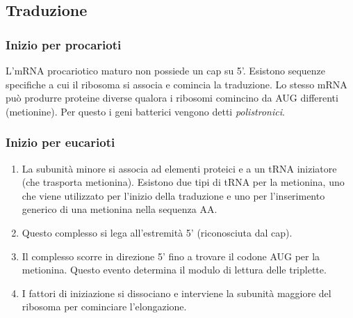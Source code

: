     \subsection{Traduzione}
        \subsubsection{Inizio per procarioti}
            L'mRNA procariotico maturo non possiede un cap su 5'.
            Esistono sequenze specifiche a cui il ribosoma si associa e comincia la traduzione. Lo stesso mRNA può produrre proteine diverse qualora i ribosomi comincino da AUG differenti (metionine). Per questo i geni batterici vengono detti \textit{polistronici}.
        
        \subsubsection{Inizio per eucarioti}
            \begin{enumerate}
                \item La subunità minore si associa ad elementi proteici e a un tRNA iniziatore (che trasporta metionina). Esistono due tipi di tRNA per la metionina, uno che viene utilizzato per l'inizio della traduzione e uno per l'inserimento generico di una metionina nella sequenza AA.
                \item Questo complesso si lega all'estremità 5' (riconosciuta dal cap).
                \item Il complesso scorre in direzione 5' fino a trovare il codone AUG per la metionina. Questo evento determina il modulo di lettura delle triplette.
                \item I fattori di iniziazione si dissociano e interviene la subunità maggiore del ribosoma per cominciare l'elongazione.
            \end{enumerate}
            
